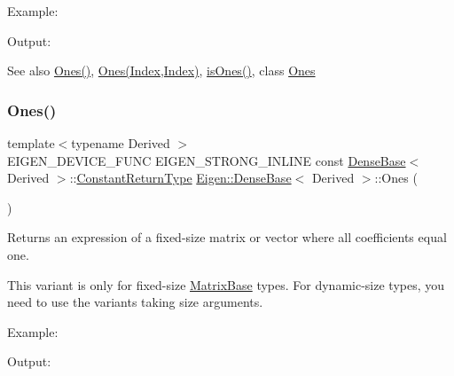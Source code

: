 Example\+: 
\begin{DoxyCodeInclude}{0}
\end{DoxyCodeInclude}
 Output\+: 
\begin{DoxyVerbInclude}
\end{DoxyVerbInclude}


\begin{DoxySeeAlso}{See also}
\mbox{\hyperlink{class_eigen_1_1_dense_base_a1284a38971d817c33e40c226f6347e37}{Ones()}}, \mbox{\hyperlink{class_eigen_1_1_dense_base_adb1ce2c904a1eb3f3bab81ced1b916b6}{Ones(\+Index,\+Index)}}, \mbox{\hyperlink{class_eigen_1_1_dense_base_a91fb1c80e1fd4970a16fd509764225d7}{is\+Ones()}}, class \mbox{\hyperlink{class_eigen_1_1_dense_base_adb1ce2c904a1eb3f3bab81ced1b916b6}{Ones}} 
\end{DoxySeeAlso}
\mbox{\label{class_eigen_1_1_dense_base_a1284a38971d817c33e40c226f6347e37}} 
\subsubsection{\texorpdfstring{Ones()}{Ones()}\hspace{0.1cm}{\footnotesize\ttfamily [3/3]}}
{\footnotesize\ttfamily template$<$typename Derived $>$ \\
E\+I\+G\+E\+N\+\_\+\+D\+E\+V\+I\+C\+E\+\_\+\+F\+U\+NC E\+I\+G\+E\+N\+\_\+\+S\+T\+R\+O\+N\+G\+\_\+\+I\+N\+L\+I\+NE const \mbox{\hyperlink{class_eigen_1_1_dense_base}{Dense\+Base}}$<$ Derived $>$\+::\mbox{\hyperlink{class_eigen_1_1_cwise_nullary_op}{Constant\+Return\+Type}} \mbox{\hyperlink{class_eigen_1_1_dense_base}{Eigen\+::\+Dense\+Base}}$<$ Derived $>$\+::Ones (\begin{DoxyParamCaption}{ }\end{DoxyParamCaption})\hspace{0.3cm}{\ttfamily [static]}}

\begin{DoxyReturn}{Returns}
an expression of a fixed-\/size matrix or vector where all coefficients equal one.
\end{DoxyReturn}
This variant is only for fixed-\/size \mbox{\hyperlink{class_eigen_1_1_matrix_base}{Matrix\+Base}} types. For dynamic-\/size types, you need to use the variants taking size arguments.

Example\+: 
\begin{DoxyCodeInclude}{0}
\end{DoxyCodeInclude}
 Output\+: 
\begin{DoxyVerbInclude}
\end{DoxyVerbInclude}



